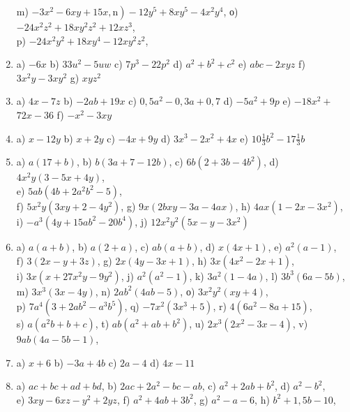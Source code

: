 \documentclass[10pt]{article}
\begin{document}
\begin{enumerate}
m) \(\left.-3 x^{2}-6 x y+15 x, \mathrm{n}\right)-12 y^{5}+8 x y^{5}-4 x^{2} y^{4}\), о) \(-24 x^{2} z^{2}+18 x y^{2} z^{2}+12 x z^{3}\),\\
p) \(-24 x^{2} y^{2}+18 x y^{4}-12 x y^{2} z^{2}\),
  \item a) \(-6 x\) b) \(33 u^{2}-5 u w\) c) \(7 p^{3}-22 p^{2}\) d) \(a^{2}+b^{2}+c^{2}\) e) \(a b c-2 x y z\) f) \(3 x^{2} y-3 x y^{2}\) g) \(x y z^{2}\)
  \item a) \(4 x-7 z\) b) \(-2 a b+19 x\) c) \(0,5 a^{2}-0,3 a+0,7\) d) \(-5 a^{2}+9 p\) e) \(-18 x^{2}+\) \(72 x-36\) f) \(-x^{2}-3 x y\)
  \item a) \(x-12 y\) b) \(x+2 y\) c) \(-4 x+9 y\) d) \(3 x^{3}-2 x^{2}+4 x\) e) \(10 \frac{1}{3} b^{2}-17 \frac{1}{3} b\)
  \item a) \(a(17+b)\), b) \(b(3 a+7-12 b)\), c) \(6 b\left(2+3 b-4 b^{2}\right)\), d) \(4 x^{2} y(3-5 x+4 y)\),\\
e) \(5 a b\left(4 b+2 a^{2} b^{2}-5\right)\),\\
f) \(5 x^{2} y\left(3 x y+2-4 y^{2}\right)\), g) \(9 x(2 b x y-3 a-4 a x)\), h) \(4 a x\left(1-2 x-3 x^{2}\right)\),\\
i) \(-a^{3}\left(4 y+15 a b^{2}-20 b^{4}\right)\), j) \(12 x^{2} y^{2}\left(5 x-y-3 x^{2}\right)\)
  \item a) \(a(a+b)\), b) \(a(2+a)\), c) \(a b(a+b)\), d) \(x(4 x+1)\), e) \(a^{2}(a-1)\),\\
f) \(3(2 x-y+3 z)\), g) \(2 x(4 y-3 x+1)\), h) \(3 x\left(4 x^{2}-2 x+1\right)\),\\
i) \(3 x\left(x+27 x^{2} y-9 y^{2}\right)\), j) \(a^{2}\left(a^{2}-1\right)\), k) \(3 a^{2}(1-4 a)\), l) \(3 b^{3}(6 a-5 b)\),\\
m) \(3 x^{3}(3 x-4 y)\), n) \(2 a b^{2}(4 a b-5)\), о) \(3 x^{2} y^{2}(x y+4)\),\\
p) \(7 a^{4}\left(3+2 a b^{2}-a^{3} b^{5}\right)\), q) \(-7 x^{2}\left(3 x^{3}+5\right)\), r) \(4\left(6 a^{2}-8 a+15\right)\),\\
s) \(a\left(a^{2} b+b+c\right)\), t) \(a b\left(a^{2}+a b+b^{2}\right)\), u) \(2 x^{3}\left(2 x^{2}-3 x-4\right)\), v) \(9 a b(4 a-5 b-1)\),
  \item a) \(x+6\) b) \(-3 a+4 b\) c) \(2 a-4\) d) \(4 x-11\)
  \item a) \(a c+b c+a d+b d\), b) \(2 a c+2 a^{2}-b c-a b\), c) \(a^{2}+2 a b+b^{2}\), d) \(a^{2}-b^{2}\),\\
e) \(3 x y-6 x z-y^{2}+2 y z\), f) \(a^{2}+4 a b+3 b^{2}\), g) \(a^{2}-a-6\), h) \(b^{2}+1,5 b-10\),\\

\end{enumerate}
\end{document}
